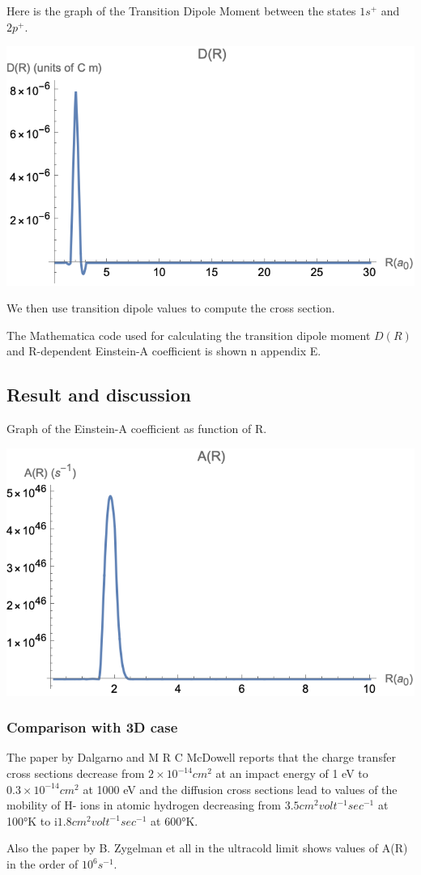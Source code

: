 Here is the graph of the Transition Dipole Moment between the states $ 1s^{+} $ and $ 2p^{+} $.

\includegraphics{DR-SI.png}

We then use transition dipole values to compute the cross section. 

The Mathematica code used for calculating the transition dipole moment  $ D(R) $ and R-dependent Einstein-A coeﬃcient is shown n appendix E.

\subsection{Result and discussion}

Graph of the Einstein-A coefficient as function of R.

\includegraphics{AR-SI.png}

\subsubsection{Comparison with 3D case}


The paper by Dalgarno and  M R C McDowell \cite{DalgarnoMcDowel} reports that the charge transfer cross sections decrease from $ 2 × 10^{-14} cm^2 $ at an impact energy of 1 eV to $ 0.3 × 10^{-14} cm^2 $ at 1000 eV and the diffusion cross sections lead to values of the mobility of H- ions in atomic hydrogen decreasing from $ 3.5 cm^2 volt^{-1} sec^{-1} $ at 100°K to i$ 1.8 cm^2 volt^{-1} sec^{-1} $ at 600°K.

Also the paper by B. Zygelman et all \cite{ZL} in the ultracold limit shows values of A(R) in the order of $ 10^6 s^{-1} $.
